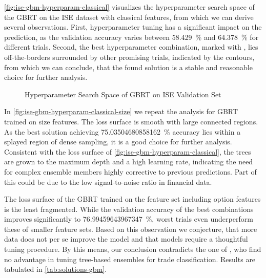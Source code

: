 \cref{fig:ise-gbm-hyperparam-classical} visualizes the hyperparameter search space of the \gls{GBRT} on the \gls{ISE} dataset with classical features, from which we can derive several observations. First, hyperparameter tuning has a significant impact on the prediction, as the validation accuracy varies between \SI{58.429}{\percent} and \SI{64.378}{\percent} for different trials. Second, the best hyperparameter combination, marked with \bestcircle, lies off-the-borders surrounded by other promising trials, indicated by the contours, from which we can conclude, that the found solution is a stable and reasonable choice for further analysis.

\begin{figure}[!h]
    \vfill
    \caption[Hyperparameter Search Space of Gradient-Boosting]{Hyperparameter Search Space of \gls{GBRT} on \gls{ISE} Validation Set}
    \label{fig:ise-gbm-hyperparam}
\end{figure}
\clearpage
\begin{figure}[!ht]
    \ContinuedFloat
\end{figure}

In \cref{fig:ise-gbm-hyperparam-classical-size} we repeat the analysis for \gls{GBRT} trained on size features. The loss surface is smooth with large connected regions. As the best solution achieving \SI{75.03504680858162}{\percent} accuracy lies within a splayed region of dense sampling, it is a good choice for further analysis. Consistent with the loss surface of \cref{fig:ise-gbm-hyperparam-classical}, the trees are grown to the maximum depth and a high learning rate, indicating the need for complex ensemble members highly corrective to previous predictions. Part of this could be due to the low signal-to-noise ratio in financial data.

The loss surface of the \gls{GBRT} trained on the feature set including option features is the least fragmented. While the validation accuracy of the best combinations improves significantly to \SI{76.99459643967347}{\percent}, worst trials even underperform these of smaller feature sets. Based on this observation we conjecture, that more data does not per se improve the model and that models require a thoughtful tuning procedure. By this means, our conclusion contradicts the one of \textcite[][14]{ronenMachineLearningTrade2022}, who find no advantage in tuning tree-based ensembles for trade classification. Results are tabulated in \cref{tab:solutions-gbm}.


